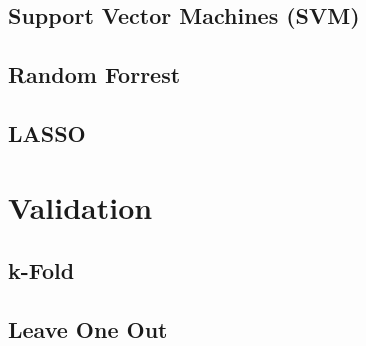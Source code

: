 \documentclass[../thesis.tex]{subfiles}
\begin{document}
\subsection{Support Vector Machines (SVM)}
\label{subsec:svm}

\subsection{Random Forrest}
\label{subsec:random_forr}

\subsection{LASSO}
\label{subsec:lasso}

\section{Validation}
\label{sec:validation}

\subsection{k-Fold}
\label{subsec:k_fold}

\subsection{Leave One Out}
\label{subsec:loocv}
\end{document}
